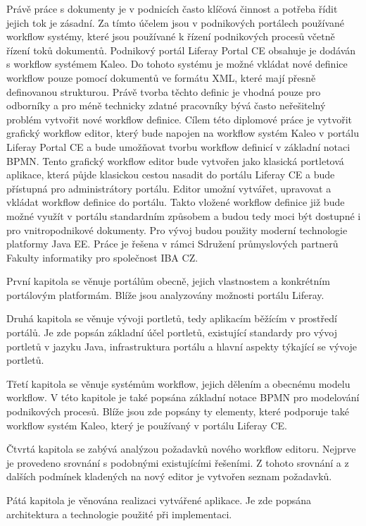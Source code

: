 \documentclass{fithesis}
\begin{document}
Právě práce s dokumenty je v podnicích často klíčová činnost a potřeba řídit jejich tok je zásadní. Za tímto účelem jsou v podnikových portálech používané workflow systémy, které jsou používané k řízení podnikových procesů včetně řízení toků dokumentů. Podnikový portál Liferay Portal CE obsahuje je dodáván s workflow systémem Kaleo. Do tohoto systému je možné vkládat nové definice workflow pouze pomocí dokumentů ve formátu XML, které mají přesně definovanou strukturou. Právě tvorba těchto definic je vhodná pouze pro odborníky a pro méně technicky zdatné pracovníky bývá často neřešitelný problém vytvořit nové workflow definice. Cílem této diplomové práce je vytvořit grafický workflow editor, který bude napojen na workflow systém Kaleo v portálu Liferay Portal CE a bude umožňovat tvorbu workflow definicí v základní notaci BPMN. Tento grafický workflow editor bude vytvořen jako klasická portletová aplikace, která půjde klasickou cestou nasadit do portálu Liferay CE a bude přístupná pro administrátory portálu. Editor umožní vytvářet, upravovat a vkládat workflow definice do portálu. Takto vložené workflow definice již bude možné využít v portálu standardním způsobem a budou tedy moci být dostupné i pro vnitropodnikové dokumenty. Pro vývoj budou použity moderní technologie platformy Java EE. Práce je řešena v rámci Sdružení průmyslových partnerů Fakulty informatiky pro společnost IBA CZ.

První kapitola se věnuje portálům obecně, jejich vlastnostem a konkrétním portálovým platformám. Blíže jsou analyzovány možnosti portálu Liferay.

Druhá kapitola se věnuje vývoji portletů, tedy aplikacím běžícím v prostředí portálů. Je zde popsán základní účel portletů, existující standardy pro vývoj portletů v jazyku Java, infrastruktura portálu a hlavní aspekty týkající se vývoje portletů.

Třetí kapitola se věnuje systémům workflow, jejich dělením a obecnému modelu workflow. V této kapitole je také popsána základní notace BPMN pro modelování podnikových procesů. Blíže jsou zde popsány ty elementy, které podporuje také workflow systém Kaleo, který je používaný v portálu Liferay CE.

Čtvrtá kapitola se zabývá analýzou požadavků nového workflow editoru. Nejprve je provedeno srovnání s podobnými existujícími řešeními. Z tohoto srovnání a z dalších podmínek kladených na nový editor je vytvořen seznam požadavků.

Pátá kapitola je věnována realizaci vytvářené aplikace. Je zde popsána architektura a technologie použité při implementaci.
\end{document}
